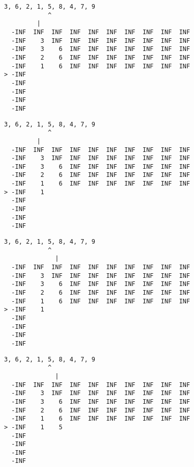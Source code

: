 { \begin{verbatim}
3, 6, 2, 1, 5, 8, 4, 7, 9
            ^
         |
  -INF  INF  INF  INF  INF  INF  INF  INF  INF  INF
  -INF    3  INF  INF  INF  INF  INF  INF  INF  INF
  -INF    3    6  INF  INF  INF  INF  INF  INF  INF
  -INF    2    6  INF  INF  INF  INF  INF  INF  INF
  -INF    1    6  INF  INF  INF  INF  INF  INF  INF
> -INF                                             
  -INF                                             
  -INF                                             
  -INF                                             
  -INF                                             
\end{verbatim} }

{ \begin{verbatim}
3, 6, 2, 1, 5, 8, 4, 7, 9
            ^
         |
  -INF  INF  INF  INF  INF  INF  INF  INF  INF  INF
  -INF    3  INF  INF  INF  INF  INF  INF  INF  INF
  -INF    3    6  INF  INF  INF  INF  INF  INF  INF
  -INF    2    6  INF  INF  INF  INF  INF  INF  INF
  -INF    1    6  INF  INF  INF  INF  INF  INF  INF
> -INF    1                                        
  -INF                                             
  -INF                                             
  -INF                                             
  -INF                                             
\end{verbatim} }

{ \begin{verbatim}
3, 6, 2, 1, 5, 8, 4, 7, 9
            ^
              |
  -INF  INF  INF  INF  INF  INF  INF  INF  INF  INF
  -INF    3  INF  INF  INF  INF  INF  INF  INF  INF
  -INF    3    6  INF  INF  INF  INF  INF  INF  INF
  -INF    2    6  INF  INF  INF  INF  INF  INF  INF
  -INF    1    6  INF  INF  INF  INF  INF  INF  INF
> -INF    1                                        
  -INF                                             
  -INF                                             
  -INF                                             
  -INF                                             
\end{verbatim} }

{ \begin{verbatim}
3, 6, 2, 1, 5, 8, 4, 7, 9
            ^
              |
  -INF  INF  INF  INF  INF  INF  INF  INF  INF  INF
  -INF    3  INF  INF  INF  INF  INF  INF  INF  INF
  -INF    3    6  INF  INF  INF  INF  INF  INF  INF
  -INF    2    6  INF  INF  INF  INF  INF  INF  INF
  -INF    1    6  INF  INF  INF  INF  INF  INF  INF
> -INF    1    5                                   
  -INF                                             
  -INF                                             
  -INF                                             
  -INF                                             
\end{verbatim} }


